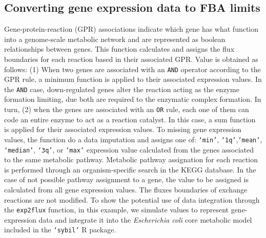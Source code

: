 \subsection*{Converting gene expression data to FBA limits}
Gene-protein-reaction (GPR) associations indicate which gene has what function into a genome-scale metabolic network and are represented as boolean relationships between genes. This function calculates and assigns the flux boundaries for each reaction based in their associated GPR. Value is obtained as follows: (1) When two genes are associated with an \texttt{AND} operator according to the GPR rule, a minimum function is applied to their associated expression values. In the \texttt{AND} case, down-regulated genes alter the reaction acting as the enzyme formation limiting, due both are required to the enzymatic complex formation. In turn, (2) when the genes are associated with an \texttt{OR} rule, each one of them can code an entire enzyme to act as a reaction catalyst. In this case, a sum function is applied for their associated expression values.  To missing gene expression values, the function do a data imputation and assigns one of: \texttt{`min'}, \texttt{`1q'},\texttt{`mean'}, \texttt{`median'}, \texttt{`3q'}, or \texttt{`max'} expression value calculated from the genes associated to the same metabolic pathway. Metabolic pathway assignation for each reaction is performed through an organism-specific search in the KEGG database. In the case of not possible pathway assignment to a gene, the value to be assigned is calculated from all gene expression values. The fluxes boundaries of exchange reactions are not modified.
To show the potential use of data integration through the \texttt{exp2flux} function, in this example, we simulate values to represent gene-expression data and integrate it into the \emph{Escherichia coli} core metabolic model included in the \texttt{`sybil'} R package. \\

